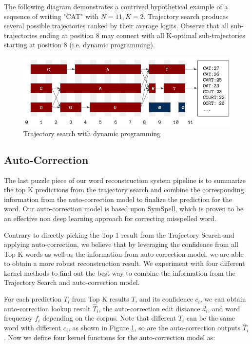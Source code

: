 \documentclass{article}
\begin{document}
\begin{multicols*}{2}
The following diagram demonstrates a contrived hypothetical example of a sequence of writing "CAT" with $N=11, K=2$. Trajectory search produces several possible trajectories ranked by their average logits. Observe that all sub-trajectories ending at position 8 may connect with all K-optimal sub-trajectories starting at position 8 (i.e. dynamic programming).

\begin{figure}[H]
    \centering
    \includegraphics[scale = 0.27]{traj_search.png}
    \caption{Trajectory search with dynamic programming}
    \label{fig:tajectory_dp}
\end{figure}


\subsection{Auto-Correction}

The last puzzle piece of our word reconstruction system pipeline is to summarize the top K predictions from the trajectory search and combine the corresponding information from the auto-correction model to finalize the prediction for the word. Our auto-correction model is based upon SymSpell, which is proven \cite{SymSpell} to be an effective non deep learning approach for correcting misspelled word. 

Contrary to directly picking the Top 1 result from the Trajectory Search and applying auto-correction, we believe that by leveraging the confidence from all Top K words as well as the information from auto-correction model, we are able to obtain a more robust reconstruction result. We experiment with four different kernel methods to find out the best way to combine the information from the Trajectory Search and auto-correction model. 

For each prediction $T_i$ from Top K results $T$, and its confidence $c_i$, we can obtain auto-correction lookup result $\hat{T}_i$, the auto-correction edit distance $d_i$, and word frequency $f_i$ depending on the corpus. Note that different $T_i$ can be the same word with different $c_i$, as shown in Figure \ref{fig:tajectory_dp}, so are the auto-correction outputs $\hat{T}_i$. Now we define four kernel functions for the auto-correction model as:


\end{multicols*}
\end{document}
